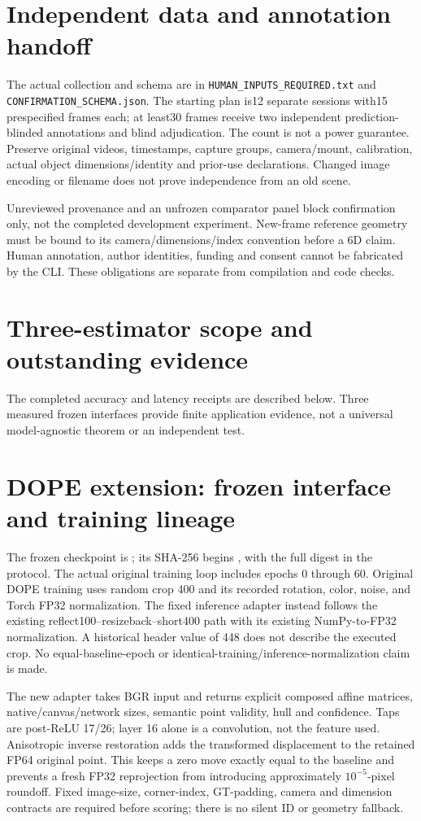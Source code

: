 \documentclass[10pt]{article}
\begin{document}
\section{Independent data and annotation handoff}
The actual collection and schema are in \texttt{HUMAN\_INPUTS\_REQUIRED.txt} and \texttt{CONFIRMATION\_SCHEMA.json}. The starting plan is12 separate sessions with15 prespecified frames each; at least30 frames receive two independent prediction-blinded annotations and blind adjudication. The count is not a power guarantee. Preserve original videos, timestamps, capture groups, camera/mount, calibration, actual object dimensions/identity and prior-use declarations. Changed image encoding or filename does not prove independence from an old scene.

Unreviewed provenance and an unfrozen comparator panel block confirmation only, not the completed development experiment. New-frame reference geometry must be bound to its camera/dimensions/index convention before a 6D claim. Human annotation, author identities, funding and consent cannot be fabricated by the CLI. These obligations are separate from compilation and code checks.
\section{Three-estimator scope and outstanding evidence}
\ThirdEstimatorStatus{}
The completed accuracy and latency receipts are described below. Three measured frozen interfaces provide finite application evidence, not a universal model-agnostic theorem or an independent test.

\section{DOPE extension: frozen interface and training lineage}
\DopeMainStatus{}
The frozen checkpoint is ; its SHA-256 begins , with the full digest in the protocol. The actual original training loop includes epochs 0 through 60. Original DOPE training uses random crop 400 and its recorded rotation, color, noise, and Torch FP32 normalization. The fixed inference adapter instead follows the existing reflect100--resizeback--short400 path with its existing NumPy-to-FP32 normalization. A historical header value of 448 does not describe the executed crop. No equal-baseline-epoch or identical-training/inference-normalization claim is made.

The new adapter takes BGR input and returns explicit composed affine matrices, native/canvas/network sizes, semantic point validity, hull and confidence. Taps are post-ReLU 17/26; layer 16 alone is a convolution, not the feature used. Anisotropic inverse restoration adds the transformed displacement to the retained FP64 original point. This keeps a zero move exactly equal to the baseline and prevents a fresh FP32 reprojection from introducing approximately $10^{-5}$-pixel roundoff. Fixed image-size, corner-index, GT-padding, camera and dimension contracts are required before scoring; there is no silent ID or geometry fallback.
\end{document}
